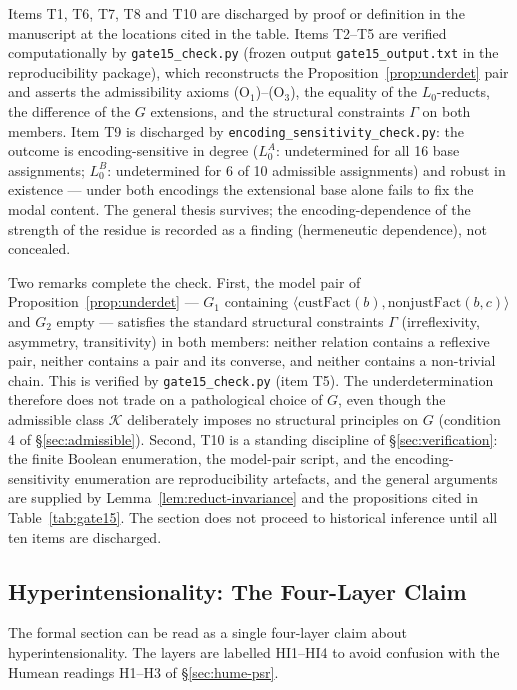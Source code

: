 \documentclass[11pt]{article}
\theoremstyle{plain}
\theoremstyle{definition}
\theoremstyle{remark}
\begin{document}
Items T1, T6, T7, T8 and T10 are discharged by proof or definition
in the manuscript at the locations cited in the table. Items T2--T5
are verified computationally by \texttt{gate15\_check.py} (frozen
output \texttt{gate15\_output.txt} in the reproducibility package),
which reconstructs the Proposition~\ref{prop:underdet} pair and
asserts the admissibility axioms (O$_1$)--(O$_3$), the equality of the
$L_0$-reducts, the difference of the $G$ extensions, and the
structural constraints $\Gamma$ on both members. Item T9 is
discharged by \texttt{encoding\_sensitivity\_check.py}: the outcome is
encoding-sensitive in degree ($L_0^A$: undetermined for all 16 base
assignments; $L_0^B$: undetermined for 6 of 10 admissible assignments)
and robust in existence --- under both encodings the extensional base
alone fails to fix the modal content. The general thesis survives; the
encoding-dependence of the strength of the residue is recorded as a
finding (hermeneutic dependence), not concealed.

Two remarks complete the check. First, the model pair of
Proposition~\ref{prop:underdet} --- $G_1$ containing
$\langle \mathrm{custFact}(b), \mathrm{nonjustFact}(b,c)\rangle$ and
$G_2$ empty --- satisfies the standard structural constraints $\Gamma$
(irreflexivity, asymmetry, transitivity) in both members: neither
relation contains a reflexive pair, neither contains a pair and its
converse, and neither contains a non-trivial chain. This is verified
by \texttt{gate15\_check.py} (item T5). The underdetermination
therefore does not trade on a pathological choice of $G$, even though
the admissible class $\mathcal K$ deliberately imposes no structural
principles on $G$ (condition 4 of \S\ref{sec:admissible}). Second, T10
is a standing discipline of \S\ref{sec:verification}: the finite
Boolean enumeration, the model-pair script, and the
encoding-sensitivity enumeration are reproducibility artefacts, and
the general arguments are supplied by Lemma~\ref{lem:reduct-invariance}
and the propositions cited in Table~\ref{tab:gate15}. The section does
not proceed to historical inference until all ten items are
discharged.

\subsection{Hyperintensionality: The Four-Layer Claim}
\label{sec:hi-layers}

The formal section can be read as a single four-layer claim about
hyperintensionality. The layers are labelled HI1--HI4 to avoid
confusion with the Humean readings H1--H3 of \S\ref{sec:hume-psr}.
\end{document}
